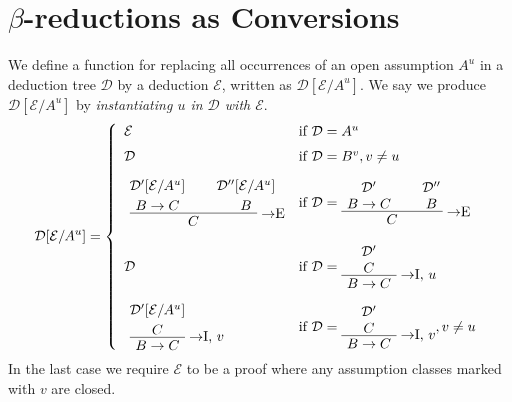 \section{$\beta$-reductions as Conversions}

\begin{definition}
We define a function for replacing all occurrences of an open assumption $A^u$ in
a deduction tree $\mathcal{D}$ by a deduction $\mathcal{E}$, written as
$\mathcal{D}[\mathcal{E}/A^u]$. We say we produce $\mathcal{D}[\mathcal{E}/A^u]$
by \textit{instantiating $u$ in $\mathcal{D}$ with $\mathcal{E}$}.
\[
  \mathcal{D}[\mathcal{E}/A^u] =
  \left\{
  \begin{array}{ll}
  \mathcal{E} & \mbox{if } \mathcal{D} = A^u \\[6pt]
  \mathcal{D} & \mbox{if } \mathcal{D} = B^v, v \neq u \\[10pt]
  \AxiomC{$\mathcal{D}'[\mathcal{E}/A^u]$}
  \noLine
  \UnaryInfC{$B \to C$}
  \AxiomC{$\mathcal{D}''[\mathcal{E}/A^u]$}
  \noLine
  \UnaryInfC{$B$}
  \RightLabel{$\to$E}
  \BinaryInfC{$C$}
  \DisplayProof & \mbox{if } \mathcal{D} =
    \AxiomC{$\mathcal{D}'$}
    \noLine
    \UnaryInfC{$B \to C$}
    \AxiomC{$\mathcal{D}''$}
    \noLine
    \UnaryInfC{$B$}
    \RightLabel{$\to$E}
    \BinaryInfC{$C$}
    \DisplayProof \\[24pt]
  \mathcal{D} & \mbox{if } \mathcal{D} =
    \AxiomC{$\mathcal{D}'$}
    \noLine
    \UnaryInfC{$C$}
    \RightLabel{$\to$I, $u$}
    \UnaryInfC{$B \to C$}
    \DisplayProof \\[20pt]
  \AxiomC{$\mathcal{D}'[\mathcal{E}/A^u]$}
  \noLine
  \UnaryInfC{$C$}
  \RightLabel{$\to$I, $v$}
  \UnaryInfC{$B \to C$}
  \DisplayProof & \mbox{if } \mathcal{D} =
    \AxiomC{$\mathcal{D}'$}
    \noLine
    \UnaryInfC{$C$}
    \RightLabel{$\to$I, $v$}
    \UnaryInfC{$B \to C$}
    \DisplayProof, v \neq u
  \end{array}
  \right.
\]
In the last case we require $\mathcal{E}$ to be a proof where any assumption
classes marked with $v$ are closed.
\end{definition}

